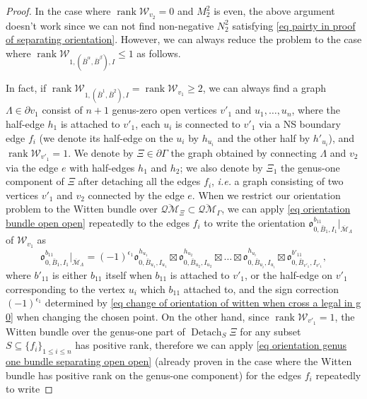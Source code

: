 \documentclass[11pt,a4paper]{article}
\theoremstyle{definition}
\theoremstyle{remark}
\newcommand{\oQMb}{{\overline{\mathcal{QM}}}}
\numberwithin{equation}{section}
\def\Mbar{{\overline{\mathcal M}}}
\begin{document}
\begin{proof}
     In the case where $\operatorname{rank} \mathcal W_{v_2}= 0$ and $M_2^2$ is even, the above argument doesn't work since we can not find non-negative $N_2^2$ satisfying \eqref{eq pairty in proof of separating orientation}. However, we can always reduce the problem to the case where $\operatorname{rank} \mathcal W_{1,(\bar{B}^\alpha,\bar{B}^\beta),I}\le 1$ as follows.
     
     In fact, if $\operatorname{rank} \mathcal W_{1,(\bar{B}^1,\bar{B}^2),I}= \operatorname{rank} \mathcal W_{v_1}\ge 2$, we can always find a graph $\Lambda\in \partial v_1$ consist of $n+1$ genus-zero open vertices $v'_1$ and $u_1,\dots,u_n$, where the half-edge $h_1$ is attached to $v'_1$, each $u_i$ is connected to $v'_1$ via a NS boundary edge $f_i$ (we denote its half-edge on the $u_i$ by $h_{u_i}$ and the other half by $h'_{u_i}$), and $\operatorname{rank} \mathcal W_{v'_1}=1$. We denote by $\Xi\in \partial \Gamma$ the graph obtained by connecting $\Lambda$ and $v_2$ via the edge $e$ with half-edges $h_1$ and $h_2$; we also denote by $\Xi_1$ the genus-one component of $\Xi$ after detaching all the edges $f_i$, \textit{i.e.} a graph consisting of two vertices $v'_1$ and $v_2$ connected by the edge $e$.
     When we restrict our orientation problem to the Witten bundle over $\oQMb_\Xi\subset \oQMb_{\Gamma}$, we can apply \eqref{eq orientation bundle open open} repeatedly to the edges $f_i$ to write the orientation ${\mathfrak{o}}^{b_{11}}_{0,\bar B_1,I_1}\big \vert_{\Mbar_{\Lambda}}$ of $\mathcal W_{v_1}$ as 
     $$
     {\mathfrak{o}}^{b_{11}}_{0,\bar B_1,I_1}\big \vert_{\Mbar_{\Lambda}}=(-1)^{\epsilon_1}{\mathfrak{o}}^{h_{u_1}}_{0,\bar B_{u_1},I_{u_1}}\boxtimes {\mathfrak{o}}^{h_{u_2}}_{0,\bar B_{u_2},I_{u_2}}\boxtimes \dots \boxtimes {\mathfrak{o}}^{h_{u_i}}_{0,\bar B_{u_i},I_{u_i}}\boxtimes {\mathfrak{o}}^{b'_{11}}_{0,\bar B_{v'_1},I_{v'_1}},
     $$
     where $b'_{11}$ is either $b_{11}$ itself when $b_{11}$ is attached to $v'_1$, or the half-edge on $v'_1$ corresponding to the vertex $u_i$ which $b_{11}$ attached to,
     and the sign correction $(-1)^{\epsilon_1}$ determined by \eqref{eq change of orientation of witten when cross a legal in g 0} when changing the chosen point. 
     On the other hand, since $\operatorname{rank} \mathcal W_{v'_1}=1$, the Witten bundle over the genus-one part of $\operatorname{Detach}_{S}\Xi$ for any subset $S \subseteq \{f_i\}_{1\le i \le n}$ has positive rank, therefore we can apply \eqref{eq orientation genus one bundle separating open open} (already proven in the case where the Witten bundle has positive rank on the genus-one component) for the edges $f_i$ repeatedly to write 

\end{proof}
\end{document}
